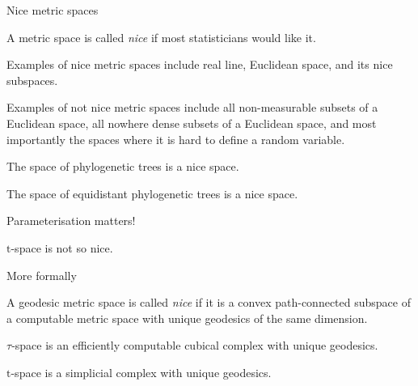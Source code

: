 \documentclass{beamer}
\renewcommand{\t}{$\mathrm{t}$}
\theoremstyle{example}
\begin{document}
\begin{frame}{Nice metric spaces}
\begin{definition}
A metric space is called {\em nice} if most statisticians would like it.
\end{definition}

Examples of nice metric spaces include real line, Euclidean space, and its nice subspaces.

Examples of not nice metric spaces include all non-measurable subsets of a Euclidean space, all nowhere dense subsets of a Euclidean space, and most importantly the spaces where it is hard to define a random variable.

\begin{theorem}
The space of phylogenetic trees is a nice space.
\end{theorem}

\begin{theorem}
The space of equidistant phylogenetic trees is a nice space.
\end{theorem}
\end{frame}

\begin{frame}{Parameterisation matters!}
\begin{theorem}
\t-space is not so nice.
\end{theorem}

\pause

More formally

\begin{definition}
A geodesic metric space is called {\em nice} if it is a convex path-connected subspace of a computable metric space with unique geodesics of the same dimension.
\end{definition}

\begin{theorem}
$\tau$-space is an efficiently computable cubical complex with unique geodesics.
\end{theorem}

\begin{theorem}
\t-space is a simplicial complex with unique geodesics.
\end{theorem}
\end{frame}
\end{document}
